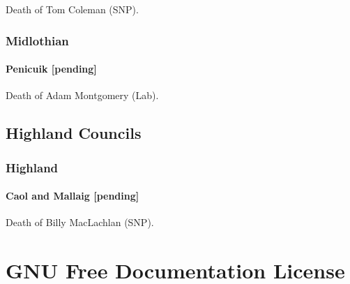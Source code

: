 \documentclass[a4paper,openany]{book}
\begin{document}
\begin{resultsiii}
Death of Tom Coleman (SNP).

\subsection*{Midlothian}

\subsubsection*{Penicuik \hspace*{\fill}\nolinebreak[1]%
\enspace\hspace*{\fill}
[pending]}


Death of Adam Montgomery (Lab).

\section{Highland Councils}

\subsection*{Highland}

\subsubsection*{Caol and Mallaig \hspace*{\fill}\nolinebreak[1]%
\enspace\hspace*{\fill}
[pending]}


Death of Billy MacLachlan (SNP).

\end{resultsiii}

\clearpage
{}
{\scriptsize%
\frenchspacing\printindex}
\thispagestyle{plain}

\chapter*{{GNU Free Documentation License}}
\pagestyle{plain}
\end{document}
